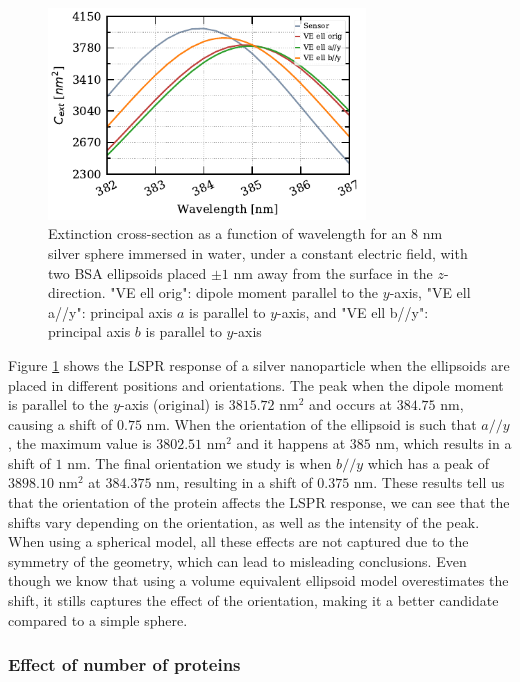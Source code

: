  \begin{figure} %
     \centering
     \includegraphics[width=0.75\textwidth]{two_ve_ell_mult_config.pdf} 
     \caption{Extinction cross-section as a function of wavelength for an $8$ nm
     silver sphere immersed in water, under a constant electric field, with two BSA ellipsoids placed 
     $\pm 1$ nm away from the surface in the $z$-direction. "VE ell orig": dipole moment parallel to the $y$-axis,
     "VE ell a//y": principal axis $a$ is parallel to $y$-axis, and "VE ell b//y": principal axis $b$ is parallel to $y$-axis}
     \label{fig:two_ell_mult_config}
  \end{figure}
 
Figure \ref{fig:two_ell_mult_config} shows the LSPR response of a silver nanoparticle when the ellipsoids 
are placed in different positions and orientations. The peak when the dipole moment is parallel to the $y$-axis (original)
is $3815.72$ nm$^2$ and occurs at $384.75$ nm, causing a shift of $0.75$ nm. When the orientation of the ellipsoid 
is such that $a//y$, the maximum value is $3802.51$ nm$^2$ and it happens at $385$ nm, which results in a shift of 
$1$ nm. The final orientation we study is when $b//y$ which has a peak of $3898.10$ nm$^2$ at $384.375$ nm, resulting 
in a shift of $0.375$ nm. These results tell us that the orientation of the protein affects the LSPR response, we can 
see that the shifts vary depending on the orientation, as well as the intensity of the peak. When using a spherical model, 
all these effects are not captured due to the symmetry of the geometry, which can lead to misleading conclusions. Even though 
we know that using a volume equivalent ellipsoid model overestimates the shift, it stills captures the effect of the orientation, making
it a better candidate compared to a simple sphere.

\subsubsection{Effect of number of proteins}

